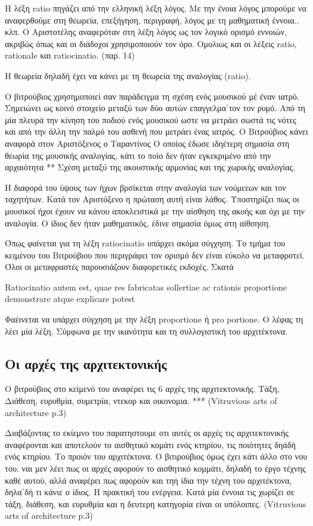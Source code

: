  Η λέξη ratio πηγάζει από την ελληνική λέξη λόγος. Με την ένοια λόγος μπορούμε να αναφερθούμε στη θεωρεία, επεξήγηση, περιγραφή, λόγος με τη μαθηματική έννοια.. κλπ. Ο Αριστοτέλης αναφερόταν στη λέξη λόγος ως τον λογικό ορισμό εννοιών, ακριβώς όπως και οι διάδοχοι χρησιμοποιούν τον όρο. Ομολιως και οι λέξεις ratio, rationale και ratiocinatio. (παρ. 14)
 
 Η θεωρεία δηλαδή έχει να κάνει με τη θεωρεία της αναλογίας (ratio). 
 
 Ο βιτρούβιος χρησημοποιεί σαν παράδειγμα τη σχέση ενός μουσικού μέ έναν ιατρό. Σημειώνει ως κοινό στοιχείο μεταξύ των δύο αυτών επαγγελμα΄τον τον ρυμό. Από τη μία πλευρά την κίνηση του ποδιού ενός μουσικού ωστε να μετράει σωστά τις νότες και από την άλλη την παλμό του ασθενή που μετράει ένας ιατρός. Ο Βιτρούβιος κάνει αναφορά στον Αριστόξενος ο Ταραντίνος Ο οποίος έδωσε ιδηέτερη σημασία στη θεωρία της μουσικής αναλογίας, κάτι το ποίο δεν ήταν εγκεκριμένο από την αρχαιότητα ** Σχέση μεταξύ της ακουστικής αρμονίας και της χωρικής αναλογίας. 
 
 Η διαφορά του ύψους των ήχων βρσίκεται στην αναλογία των νούμεεων και τον ταχητήτων. Κατά τον Αριστόξενο η πρώταση αυτή είναι λάθος. Υποστηρίζει πως οι μουσικοί ήχοι έχουν να κάνου αποκλειστικά με την αίσθηση της ακοής και όχι με την αναλογία. Ο ίδιος δεν ήταν μαθηματικός, έδινε σημασία όμως στη αίθσηση. 
 
 Όπως φαίνεται για τη λέξη ratiocinatio υπάρχει ακόμα σύγχηση. Το τμήμα του κειμένου του Βιτρούβιου που περιγράφει τον ορισμό δεν είναι εύκολο να μεταφρστεί. Όλοι οι μεταφραστές παρουσιάζουν διαφορετικές εκδοχές. Σκατά
 
  Ratiocinatio autem est, quae res fabricatas sollertiae ac rationis proportione demonstrare atque explicare potest
  
  Φαέινεται να υπάρχει σύγχηση με την λέξη proportione ή pro portione. Ο λέφας τη λέει μία λέξη. 
  Σύμφωνα με την ικανότητα και τη συλλογιστική του αρχιτέκτονα.
  
\subsection{Οι αρχές της αρχιτεκτονικής}
  
  Ο βιτρούβιος στο κείμενό του αναφέρει τις 6 αρχές της αρχιτεκτονικής. Τάξη, Διάθεση, ευρυθμία, συμετρία, ντεκορ και οικονομια. *** (Vitruvious arts of architecture p.3)
  
  Διαβάζοντας το εκίεμνο του παρατηστουμε οτι αυτές οι αρχές τις αρχιτεκτονικής αναφέρονται και αποτελούν το αισθητικό κομάτι ενός κτηρίου, τις ποιότητες δηάδή ενός κτηρίου. Το προιόν του αρχιτέκτονα. Ο βιτιρούβιος όμως έχει κάτι άλλο στο νου του. ναι μεν λέει πως οι αρχές αφορούν το αισθητικό κομμάτι, δηλαδή το έργο τέχνης καθέ αυτού, αλλά αναφέρει πως αφορούν και τηη ίδια την τέχνη του αρχιτέκτονα, δηλα΄δή τι κάνιε ο ίδιος. Η πρακτική του ενέργεια. Κατά μία έννοια τις χωρίζει σε τάξη, διάθεση, και ευρυθμία και η δευτερη κατηγορία είναι οι υπόλοιπες. (Vitruvious arts of architecture p.3)
  

